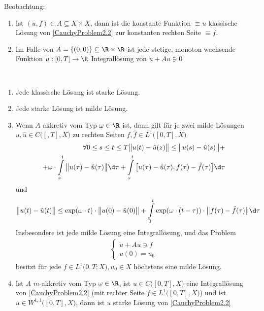 Beobachtung:
\begin{enumerate}[label=(\alph*)]
\item Ist $(u,f)\in A\subseteq X\times X$, dann ist die konstante Funktion $\equiv u$ klassische Lösung von \eqref{CauchyProblem2.2} zur konstanten rechten Seite $\equiv f$.
\item Im Falle von $A=\lbrace(0,0)\rbrace\subseteq\R\times\R$ ist jede stetige, monoton wachsende Funktion $u:[0,T]\to\R$ %
Integrallösung von $\dot{u}+Au\ni 0$
\end{enumerate}

\begin{theorem}\
\begin{enumerate}[label=(\alph*)]
\item Jede klassische Lösung ist starke Lösung.
\item Jede starke Lösung ist milde Lösung.
\item Wenn $A$ akkretiv vom Typ $\omega\in\R$ ist, dann gilt für je zwei milde Lösungen $u,\hat{u}\in C\big([,T],X\big)$ zu rechten Seiten $f,\hat{f}\in L^1\big([0,T],X\big)$
\begin{align*}
\forall 0\leq s\leq t\leq T
\big\Vert u(t)-\hat{u}(z)\big\Vert\leq\big\Vert u(s)-\hat{u}(s)\big\Vert+\\+\omega\cdot\int\limits_s^t\big\Vert u(\tau)-\hat{u}(\tau)\big\Vert\d\tau+\int\limits_s^t\big[u(\tau)-\hat{u}(\tau),f(\tau)-\hat{f}(\tau)\big]\d\tau
\end{align*}
und 
\begin{align*}
\big\Vert u(t)-\hat{u}(t)\big\Vert\leq\exp(\omega\cdot t)\cdot\big\Vert u(0)-\hat{u}(0)\big\Vert+\int\limits_0^t\exp(\omega\cdot(t-\tau))\cdot\big\Vert f(\tau)-\hat{f}(\tau)\big\Vert\d\tau
\end{align*}
Insbesondere ist jede milde Lösung eine Integrallösung, und das Problem 
\begin{align*}
\left\lbrace\begin{array}{c}
\dot{u}+Au\ni f\\
u(0)=u_0
\end{array}\right.
\end{align*}
besitzt für jede $f\in L^1\big(0,T;X),u_0\in X$ höchstens eine milde Lösung.
\item Ist $A$ $m$-akkretiv vom Typ $\omega\in\R$, ist $u\in C\big([0,T],X)$ eine Integrallösung von \eqref{CauchyProblem2.2} (mit rechter Seite $f\in L^1\big([0,T],X\big)$) und ist $u\in W^{1,1}\big([0,T],X\big)$, dann ist $u$ starke Lösung von \eqref{CauchyProblem2.2}
\end{enumerate}
\end{theorem}
